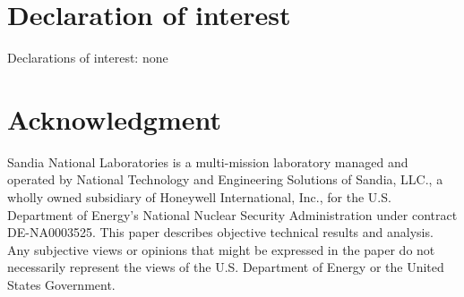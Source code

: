 \documentclass[11pt, letterpaper]{article}
\begin{document}
\section{Declaration of interest}
Declarations of interest: none

\section*{Acknowledgment}
Sandia National Laboratories is a multi-mission laboratory managed and operated by National Technology and Engineering Solutions of Sandia, LLC., a wholly owned subsidiary of Honeywell International, Inc., for the U.S. Department of Energy's National Nuclear Security Administration under contract DE-NA0003525.
This paper describes objective technical results and analysis.
Any subjective views or opinions that might be expressed in the paper do not necessarily represent the views of the U.S. Department of Energy or the United States Government.

\end{document}
